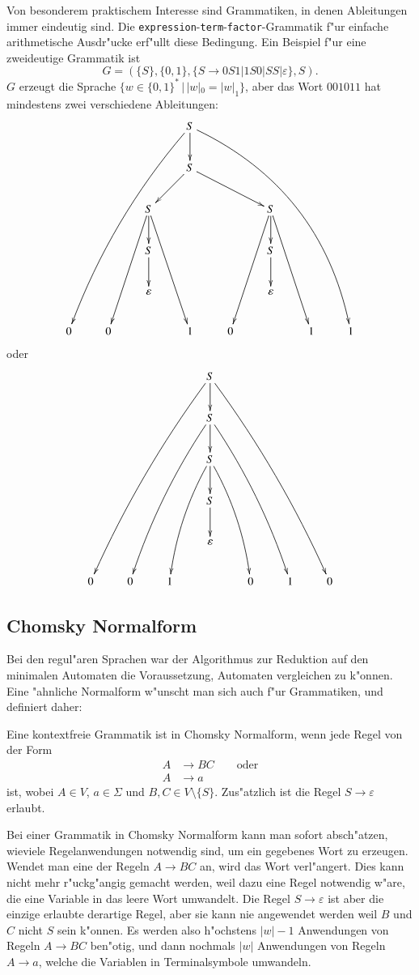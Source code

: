Von besonderem praktischem Interesse sind Grammatiken, in denen
Ableitungen immer eindeutig sind. Die
{\tt expression}-{\tt term}-{\tt factor}-Grammatik f"ur einfache
arithmetische Ausdr"ucke erf"ullt diese Bedingung. 
Ein Beispiel f"ur eine zweideutige Grammatik ist
\[
G=(\{S\}, \{0,1\}, \{S\to 0S1|1S0|SS|\varepsilon\}, S).
\]
$G$ erzeugt die Sprache
$\{w\in \{0,1\}^*\,|\, |w|_0 = |w|_1\}$, aber das Wort
$001011$ hat mindestens zwei verschiedene Ableitungen:
\[
\xymatrix{
&&&S\ar@/_10pt/[dddddlll]\ar[d]\ar@/^30pt/[dddddrrrr]
\\
&&&S\ar[dl]\ar[drr]
\\
 &&S\ar[dddl]\ar[d]\ar[dddr]&&&S\ar[dddl]\ar[d]\ar[dddr]&&
\\
&&S\ar[d]&&&S\ar[d]&&
\\
 & &\varepsilon& & &\varepsilon& & 
\\
0&0&           &1&0&           &1&1
}
\]
oder
\[
\xymatrix{
&&&S\ar@/_/[dddddlll]\ar[d]\ar@/^/[dddddrrr]
\\
&&&S\ar@/_/[ddddll]\ar[d]\ar@/^/[ddddrr]&&&
\\
&&&S\ar@/_/[dddl]\ar[d]\ar@/^/[dddr]&&&
\\
&&&S\ar[d]&&&
\\
&&&\varepsilon&&&
\\
0&0&1&&0&1&0
}
\]


\subsection{Chomsky Normalform}
Bei den regul"aren Sprachen war der Algorithmus zur Reduktion
auf den minimalen Automaten die Voraussetzung, Automaten vergleichen
zu k"onnen. Eine "ahnliche Normalform w"unscht man sich auch f"ur
Grammatiken, und definiert daher:
\begin{definition}
Eine kontextfreie Grammatik  ist in Chomsky Normalform, wenn
jede Regel von der Form
\begin{align*}
A&\to BC\qquad\text{oder}\\
A&\to a
\end{align*}
ist, wobei $A\in V$, $a\in\Sigma$ und $B, C\in V\setminus\{S\}$.
Zus"atzlich ist die Regel $S\to\varepsilon$ erlaubt. 
\end{definition}

Bei einer Grammatik in Chomsky Normalform kann man sofort absch"atzen,
wieviele Regelanwendungen notwendig sind, um ein gegebenes Wort
zu erzeugen. Wendet man eine der Regeln $A\to BC$ an, wird das
Wort verl"angert. Dies kann nicht mehr r"uckg"angig gemacht
werden, weil dazu eine Regel notwendig w"are, die eine Variable
in das leere Wort umwandelt. Die Regel $S\to\varepsilon$ ist aber
die einzige erlaubte derartige Regel, aber sie kann nie angewendet
werden weil $B$ und $C$ nicht $S$ sein k"onnen. Es werden also
h"ochstens $|w|-1$ Anwendungen von Regeln $A\to BC$ ben"otig, und dann
nochmals $|w|$ Anwendungen von Regeln $A\to a$, welche die Variablen
in Terminalsymbole umwandeln. 

